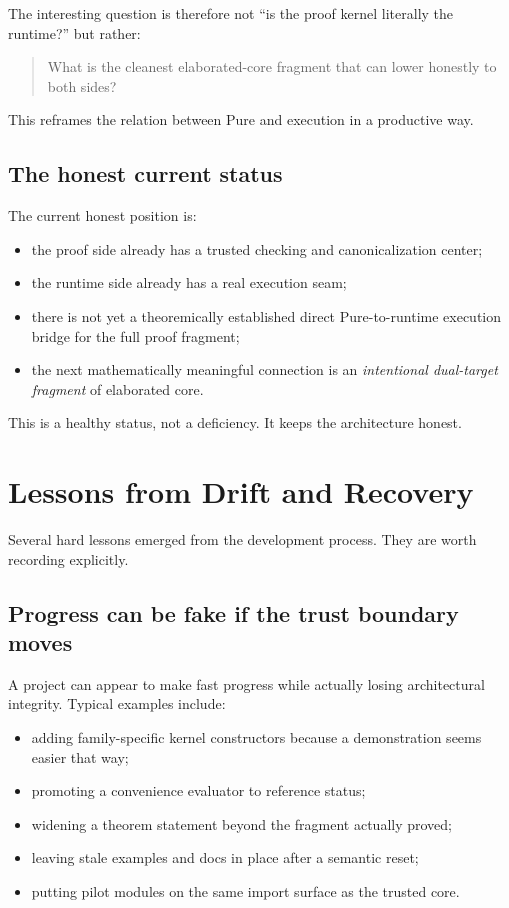 \documentclass[11pt]{article}
\begin{document}
The interesting question is therefore not ``is the proof kernel literally the
runtime?'' but rather:
\begin{quote}
What is the cleanest elaborated-core fragment that can lower honestly to both
sides?
\end{quote}

This reframes the relation between Pure and execution in a productive way.

\subsection{The honest current status}

The current honest position is:
\begin{itemize}[leftmargin=2em]
  \item the proof side already has a trusted checking and canonicalization
  center;
  \item the runtime side already has a real execution seam;
  \item there is not yet a theoremically established direct Pure-to-runtime
  execution bridge for the full proof fragment;
  \item the next mathematically meaningful connection is an \emph{intentional
  dual-target fragment} of elaborated core.
\end{itemize}

This is a healthy status, not a deficiency. It keeps the architecture honest.

\section{Lessons from Drift and Recovery}

Several hard lessons emerged from the development process. They are worth
recording explicitly.

\subsection{Progress can be fake if the trust boundary moves}

A project can appear to make fast progress while actually losing architectural
integrity. Typical examples include:
\begin{itemize}[leftmargin=2em]
  \item adding family-specific kernel constructors because a demonstration seems
  easier that way;
  \item promoting a convenience evaluator to reference status;
  \item widening a theorem statement beyond the fragment actually proved;
  \item leaving stale examples and docs in place after a semantic reset;
  \item putting pilot modules on the same import surface as the trusted core.
\end{itemize}
\end{document}
